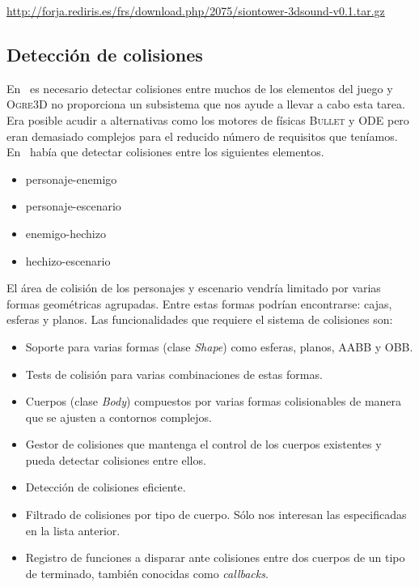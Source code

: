 \url{http://forja.rediris.es/frs/download.php/2075/siontower-3dsound-v0.1.tar.gz}\\

\subsection{Detección de colisiones}

En \juego\ es necesario detectar colisiones entre muchos de los elementos
del juego y \textsc{Ogre3D} no proporciona un subsistema que nos ayude
a llevar a cabo esta tarea. Era posible acudir a alternativas como los motores
de físicas \textsc{Bullet} y \textsc{ODE} pero eran demasiado complejos
para el reducido número de requisitos que teníamos. En \juego\ había
que detectar colisiones entre los siguientes elementos.\\

\begin{itemize}
    \itemsep0em
    \item personaje-enemigo
    \item personaje-escenario
    \item enemigo-hechizo
    \item hechizo-escenario
\end{itemize}

El área de colisión de los personajes y escenario vendría limitado por varias
formas geométricas agrupadas. Entre estas formas podrían encontrarse: cajas,
esferas y planos. Las funcionalidades que requiere el sistema de colisiones
son:\\

\begin{itemize}
    \itemsep0em
    \item Soporte para varias formas (clase \textit{Shape}) como esferas,
    planos, AABB y OBB.
    \item Tests de colisión para varias combinaciones de estas formas.
    \item Cuerpos (clase \textit{Body}) compuestos por varias formas colisionables
    de manera que se ajusten a contornos complejos.
    \item Gestor de colisiones que mantenga el control de los cuerpos existentes
    y pueda detectar colisiones entre ellos.
    \item Detección de colisiones eficiente.
    \item Filtrado de colisiones por tipo de cuerpo. Sólo nos interesan
    las especificadas en la lista anterior.
    \item Registro de funciones a disparar ante colisiones entre dos cuerpos
    de un tipo de terminado, también conocidas como \textit{callbacks}.
\end{itemize}

